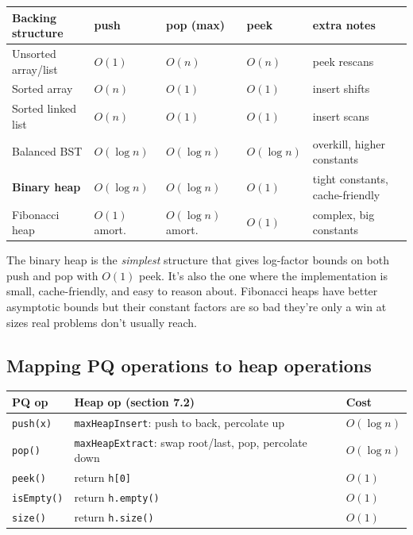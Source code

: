 \documentclass[11pt]{article}
\begin{document}
\begin{center}
\begin{tabular}{lllll}
Backing structure & push & pop (max) & peek & extra notes \\
\hline
Unsorted array/list   & $O(1)$      & $O(n)$     & $O(n)$ & peek rescans \\
Sorted array          & $O(n)$      & $O(1)$     & $O(1)$ & insert shifts \\
Sorted linked list    & $O(n)$      & $O(1)$     & $O(1)$ & insert scans \\
Balanced BST          & $O(\log n)$ & $O(\log n)$ & $O(\log n)$ & overkill, higher constants \\
\textbf{Binary heap}  & $O(\log n)$ & $O(\log n)$ & $O(1)$  & tight constants, cache-friendly \\
Fibonacci heap        & $O(1)$ amort. & $O(\log n)$ amort. & $O(1)$ & complex, big constants \\
\end{tabular}
\end{center}

The binary heap is the \emph{simplest} structure that gives log-factor bounds on both push and pop with $O(1)$ peek. It's also the one where the implementation is small, cache-friendly, and easy to reason about. Fibonacci heaps have better asymptotic bounds but their constant factors are so bad they're only a win at sizes real problems don't usually reach.

\subsection*{Mapping PQ operations to heap operations}

\begin{center}
\begin{tabular}{lll}
PQ op & Heap op (section 7.2) & Cost \\
\hline
\texttt{push(x)}   & \texttt{maxHeapInsert}: push to back, percolate up & $O(\log n)$ \\
\texttt{pop()}     & \texttt{maxHeapExtract}: swap root/last, pop, percolate down & $O(\log n)$ \\
\texttt{peek()}    & return \texttt{h[0]} & $O(1)$ \\
\texttt{isEmpty()} & return \texttt{h.empty()} & $O(1)$ \\
\texttt{size()}    & return \texttt{h.size()} & $O(1)$ \\
\end{tabular}
\end{center}
\end{document}
